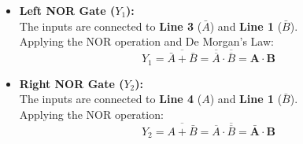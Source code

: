\documentclass[12pt, a4paper]{article}
\begin{document}
\begin{solutionbox}
																																																																																																																										    \begin{itemize}
																																																																																																																										            \item \textbf{Left NOR Gate ($Y_1$):} \\
																																																																																																																											            The inputs are connected to \textbf{Line 3} ($\bar{A}$) and \textbf{Line 1} ($\bar{B}$). \\
																																																																																																																												            Applying the NOR operation and De Morgan's Law:
																																																																																																																													            $$ Y_1 = \overline{\bar{A} + \bar{B}} = \overline{\overline{A}} \cdot \overline{\overline{B}} = \mathbf{A \cdot B} $$
																																																																																																																														            
																																																																																																																															            \item \textbf{Right NOR Gate ($Y_2$):} \\
																																																																																																																																            The inputs are connected to \textbf{Line 4} ($A$) and \textbf{Line 1} ($\bar{B}$). \\
																																																																																																																																	            Applying the NOR operation:
																																																																																																																																		            $$ Y_2 = \overline{A + \bar{B}} = \overline{A} \cdot \overline{\overline{B}} = \mathbf{\bar{A} \cdot B} $$
																																																																																																																																			        \end{itemize}


\end{solutionbox}
\end{document}
